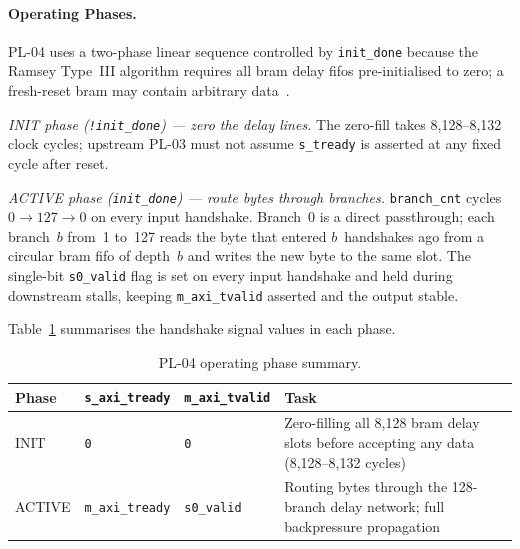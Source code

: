 
\FloatBarrier
\paragraph{Operating Phases.}

PL-04 uses a two-phase linear sequence controlled by \texttt{init\_done}
because the Ramsey Type~III algorithm requires all \ac{bram} delay
\acp{fifo} pre-initialised to zero; a fresh-reset \ac{bram} may contain
arbitrary data~\cite{ITU_J83}.

\textit{INIT phase (\texttt{!init\_done}) --- zero the delay lines.}
The zero-fill takes 8{,}128--8{,}132 clock cycles; upstream PL-03 must
not assume \texttt{s\_tready} is asserted at any fixed cycle after reset.

\textit{ACTIVE phase (\texttt{init\_done}) --- route bytes through branches.}
\texttt{branch\_cnt} cycles $0 \to 127 \to 0$ on every input handshake.
Branch~0 is a direct passthrough; each branch~$b$ from~1 to~127 reads
the byte that entered $b$~handshakes ago from a circular \ac{bram}
\ac{fifo} of depth~$b$ and writes the new byte to the same slot.
The single-bit \texttt{s0\_valid} flag is set on every input handshake
and held during downstream stalls, keeping \texttt{m\_axi\_tvalid}
asserted and the output stable.

Table~\ref{tab:pl04_phases} summarises the handshake signal values in
each phase.

\begin{table}[htbp]
  \caption{PL-04 operating phase summary.}
  \label{tab:pl04_phases}
  \centering
  \begin{tabular}{lllp{8.0cm}}
    \hline
    Phase  & \texttt{s\_axi\_tready} & \texttt{m\_axi\_tvalid} & Task \\
    \hline
    INIT   & \texttt{0}              & \texttt{0}
           & Zero-filling all 8{,}128 \ac{bram} delay slots before
             accepting any data (8{,}128--8{,}132 cycles) \\[4pt]
    ACTIVE & \texttt{m\_axi\_tready} & \texttt{s0\_valid}
           & Routing bytes through the 128-branch delay network;
             full backpressure propagation \\
    \hline
  \end{tabular}
\end{table}
\FloatBarrier

